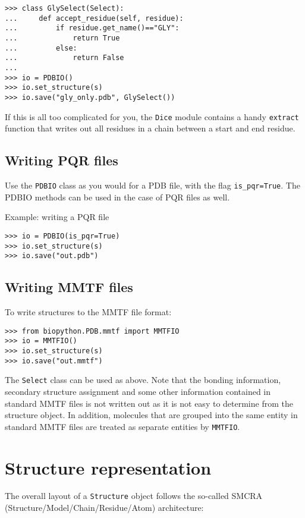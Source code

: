 \begin{verbatim}
>>> class GlySelect(Select):
...     def accept_residue(self, residue):
...         if residue.get_name()=="GLY":
...             return True
...         else:
...             return False
...
>>> io = PDBIO()
>>> io.set_structure(s)
>>> io.save("gly_only.pdb", GlySelect())
\end{verbatim}
If this is all too complicated for you, the \texttt{Dice} module contains
a handy \texttt{extract} function that writes out all residues in
a chain between a start and end residue.

\subsection{Writing PQR files}

Use the \texttt{PDBIO} class as you would for a PDB file, with the flag \texttt{is\_pqr=True}. 
The PDBIO methods can be used in the case of PQR files as well.

Example: writing a PQR file

\begin{verbatim}
>>> io = PDBIO(is_pqr=True)
>>> io.set_structure(s)
>>> io.save("out.pdb")
\end{verbatim}

\subsection{Writing MMTF files}

To write structures to the MMTF file format:

\begin{verbatim}
>>> from biopython.PDB.mmtf import MMTFIO
>>> io = MMTFIO()
>>> io.set_structure(s)
>>> io.save("out.mmtf")
\end{verbatim}

The \texttt{Select} class can be used as above. Note that the bonding
information, secondary structure assignment and some other information contained
in standard MMTF files is not written out as it is not easy to determine from
the structure object. In addition, molecules that are grouped into the same
entity in standard MMTF files are treated as separate entities by
\texttt{MMTFIO}.


\section{Structure representation}

The overall layout of a \texttt{Structure} object follows the so-called SMCRA
(Structure/Model/Chain/Residue/Atom) architecture:


